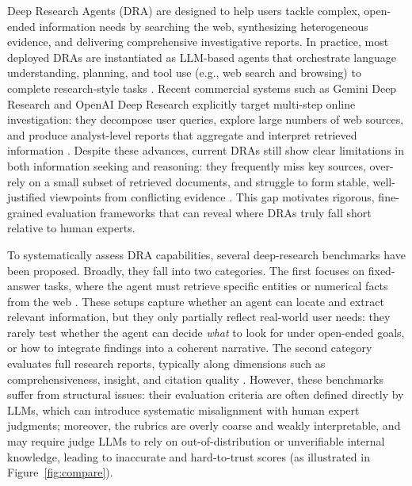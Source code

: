 \documentclass[11pt]{article}
\begin{document}
Deep Research Agents (DRA) are designed to help users tackle complex, open-ended information needs by searching the web, synthesizing heterogeneous evidence, and delivering comprehensive investigative reports. In practice, most deployed DRAs are instantiated as LLM-based agents that orchestrate language understanding, planning, and tool use (e.g., web search and browsing) to complete research-style tasks \citep{brown2020languagemodelsfewshotlearners,andreas2022languagemodelsagentmodels,nakano2022webgptbrowserassistedquestionansweringhuman}. Recent commercial systems such as Gemini Deep Research and OpenAI Deep Research explicitly target multi-step online investigation: they decompose user queries, explore large numbers of web sources, and produce analyst-level reports that aggregate and interpret retrieved information \citep{gemini_deep_research,openai_deep_research}. Despite these advances, current DRAs still show clear limitations in both information seeking and reasoning: they frequently miss key sources, over-rely on a small subset of retrieved documents, and struggle to form stable, well-justified viewpoints from conflicting evidence \citep{White2024Advancing}. This gap motivates rigorous, fine-grained evaluation frameworks that can reveal where DRAs truly fall short relative to human experts.

To systematically assess DRA capabilities, several deep-research benchmarks have been proposed. Broadly, they fall into two categories. The first focuses on fixed-answer tasks, where the agent must retrieve specific entities or numerical facts from the web \citep{wei2025browsecompsimplechallengingbenchmark,chen2025xbenchtrackingagentsproductivity,futuresearch2025deepresearchbenchevaluating,wong2025widesearchbenchmarkingagenticbroad}. These setups capture whether an agent can locate and extract relevant information, but they only partially reflect real-world user needs: they rarely test whether the agent can decide \emph{what} to look for under open-ended goals, or how to integrate findings into a coherent narrative. The second category evaluates full research reports, typically along dimensions such as comprehensiveness, insight, and citation quality \citep{du2025deepresearchbenchcomprehensivebenchmark,xu2025researcherbenchevaluatingdeepai,fan2025understandingdeepresearchreports}. However, these benchmarks suffer from structural issues: their evaluation criteria are often defined directly by LLMs, which can introduce systematic misalignment with human expert judgments; moreover, the rubrics are overly coarse and weakly interpretable, and may require judge LLMs to rely on out-of-distribution or unverifiable internal knowledge, leading to inaccurate and hard-to-trust scores (as illustrated in Figure~\ref{fig:compare}).
\end{document}
